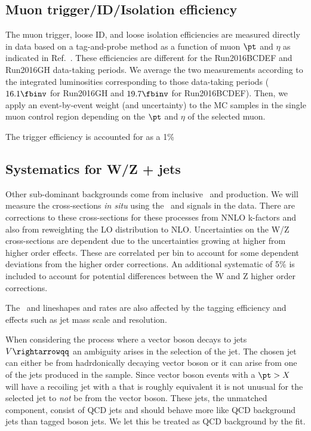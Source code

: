 \subsection{Muon trigger/ID/Isolation efficiency}
\label{sec:muonidis}

The muon trigger, loose ID, and loose isolation efficiencies are
measured directly in data based on a tag-and-probe method as a function of muon $\pt$ and $\eta$ as
indicated in Ref.~\cite{CMS-MUO-TWIKI-SF}. These efficiencies are
different for the Run2016BCDEF and Run2016GH data-taking periods. We
average the two measurements according to the integrated luminosities
corresponding to those data-taking periods ($16.1 \fbinv$ for
Run2016GH and $19.7\fbinv$ for Run2016BCDEF). Then, we apply an event-by-event weight (and
uncertainty) to the MC samples in the single muon control region depending on the $\pt$ and $\eta$ of
the selected muon.

The trigger efficiency is accounted for as a 1\% 

\subsection{Systematics for W/Z + jets}

Other sub-dominant backgrounds come from inclusive \PW~and \PZ production.
We will measure the cross-sections {\it in situ} using the \PW~and \PZ signals in the data.
There are corrections to these cross-sections for these processes from NNLO k-factors and also from reweighting the LO \pt distribution to NLO.
Uncertainties on the W/Z cross-sections are \pt dependent due to the uncertainties growing at higher \pt from higher order effects.
These are correlated per \pt bin to account for some \pt dependent deviations from the higher order corrections.
An additional systematic of 5\% is included to account for potential differences between the W and Z higher order corrections.

The \PW~and \PZ lineshapes and rates are also affected by the tagging efficiency and effects such as jet mass scale and resolution.

When considering the process where a vector boson decays to jets $V\rightarrowqq$ an ambiguity arises in the selection of the jet. The chosen jet can either be from hadrdonically decaying vector boson or it can arise from one of the jets produced in the sample. Since vector boson events with a $\pt > X$ will have a recoiling jet with a \pt that is roughly equivalent it is not unusual for the selected jet to \emph{not} be from the vector boson. These jets, the unmatched component, consist of QCD jets and should behave more like QCD background jets than tagged boson jets. We let this be treated as QCD background by the fit. 


